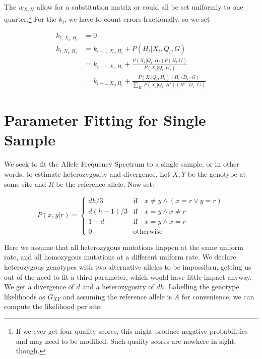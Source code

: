 \documentclass{article}
\begin{document}
The $w_{X,H}$ allow for a substitution matrix or could all be set uniformly to
one quarter.\footnote{If we ever get four quality scores, this might produce
negative probabilities and may need to be modified.  Such quality scores are
nowhere in sight, though.}  For the $k_i$, we have to count errors
fractionally, so we set

\begin{align*}
k_{1,X_i,H_i} &= 0 \\
k_{i,X_i,H_i} &= k_{i-1,X_i,H_i} + P(H_i | X_i, Q_i, G) \\
&= k_{i-1,X_i,H_i} + \frac{P(X_i | Q_i, H_i) P(H_i | G)}{P(X_i|Q_i, G_i)} \\
&= k_{i-1,X_i,H_i} + \frac{P(X_i | Q_i, H_i) \left( H_i \cdot D_i \cdot G \right) }
    {\sum_{H'} P(X_i| Q_i, H') \left( H' \cdot D_i \cdot G \right)}
\end{align*}


\section{Parameter Fitting for Single Sample}

We seek to fit the Allele Frequency Spectrum to a single sample, or in
other words, to estimate heterozygosity and divergence.  Let $X,Y$ be
the genotype at some site and $R$ be the reference allele.  Now set:

\begin{equation*}
P(x,y|r) = \left\{ \begin{array}{cl}
    dh/3 & \mbox{if} \quad x \neq y \wedge (x=r \vee y=r) \\
    d(h-1)/3 & \mbox{if} \quad x=y \wedge x \neq r \\
    1 - d & \mbox{if} \quad x=y \wedge x=r \\
    0 & \mbox{otherwise}
        \end{array} \right.
\end{equation*}

Here we assume that all heterozygous mutations happen at the same
uniform rate, and all homozygous mutations at a different uniform rate.
We declare heterozygous genotypes with two alternative alleles to be
impossibru, getting us out of the need to fit a third parameter, which
would have little impact anyway.  We get a divergence of $d$ and a
heterozygosity of $dh$.  Labelling the genotype likelihoods as $G_{XY}$
and assuming the reference allele is $A$ for convenience, we can compute
the likelihood per site:
\end{document}

